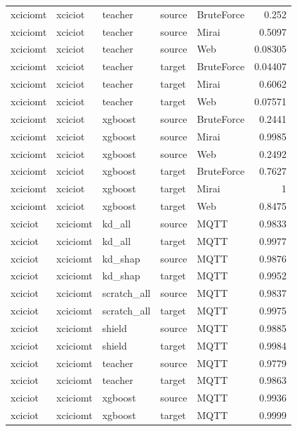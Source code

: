 \begin{table}
\begin{tabular}{lllllr}
xciciomt & xciciot & teacher & source & BruteForce & 0.252 \\
xciciomt & xciciot & teacher & source & Mirai & 0.5097 \\
xciciomt & xciciot & teacher & source & Web & 0.08305 \\
xciciomt & xciciot & teacher & target & BruteForce & 0.04407 \\
xciciomt & xciciot & teacher & target & Mirai & 0.6062 \\
xciciomt & xciciot & teacher & target & Web & 0.07571 \\
xciciomt & xciciot & xgboost & source & BruteForce & 0.2441 \\
xciciomt & xciciot & xgboost & source & Mirai & 0.9985 \\
xciciomt & xciciot & xgboost & source & Web & 0.2492 \\
xciciomt & xciciot & xgboost & target & BruteForce & 0.7627 \\
xciciomt & xciciot & xgboost & target & Mirai & 1 \\
xciciomt & xciciot & xgboost & target & Web & 0.8475 \\
xciciot & xciciomt & kd_all & source & MQTT & 0.9833 \\
xciciot & xciciomt & kd_all & target & MQTT & 0.9977 \\
xciciot & xciciomt & kd_shap & source & MQTT & 0.9876 \\
xciciot & xciciomt & kd_shap & target & MQTT & 0.9952 \\
xciciot & xciciomt & scratch_all & source & MQTT & 0.9837 \\
xciciot & xciciomt & scratch_all & target & MQTT & 0.9975 \\
xciciot & xciciomt & shield & source & MQTT & 0.9885 \\
xciciot & xciciomt & shield & target & MQTT & 0.9984 \\
xciciot & xciciomt & teacher & source & MQTT & 0.9779 \\
xciciot & xciciomt & teacher & target & MQTT & 0.9863 \\
xciciot & xciciomt & xgboost & source & MQTT & 0.9936 \\
xciciot & xciciomt & xgboost & target & MQTT & 0.9999 \\
\bottomrule
\end{tabular}
\end{table}
